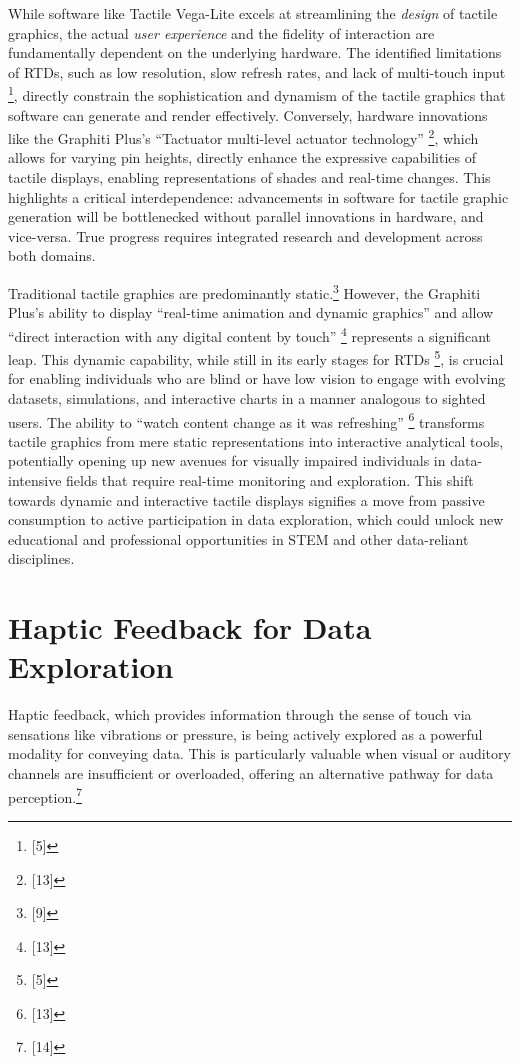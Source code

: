 While software like Tactile Vega-Lite excels at streamlining the \textit{design} of tactile graphics, the actual \textit{user experience} and the fidelity of interaction are fundamentally dependent on the underlying hardware. The identified limitations of RTDs, such as low resolution, slow refresh rates, and lack of multi-touch input \footnote{[5]}, directly constrain the sophistication and dynamism of the tactile graphics that software can generate and render effectively. Conversely, hardware innovations like the Graphiti Plus's ``Tactuator\texttrademark{} multi-level actuator technology'' \footnote{[13]}, which allows for varying pin heights, directly enhance the expressive capabilities of tactile displays, enabling representations of shades and real-time changes. This highlights a critical interdependence: advancements in software for tactile graphic generation will be bottlenecked without parallel innovations in hardware, and vice-versa. True progress requires integrated research and development across both domains.

Traditional tactile graphics are predominantly static.\footnote{[9]} However, the Graphiti Plus's ability to display ``real-time animation and dynamic graphics'' and allow ``direct interaction with any digital content by touch'' \footnote{[13]} represents a significant leap. This dynamic capability, while still in its early stages for RTDs \footnote{[5]}, is crucial for enabling individuals who are blind or have low vision to engage with evolving datasets, simulations, and interactive charts in a manner analogous to sighted users. The ability to ``watch content change as it was refreshing'' \footnote{[13]} transforms tactile graphics from mere static representations into interactive analytical tools, potentially opening up new avenues for visually impaired individuals in data-intensive fields that require real-time monitoring and exploration. This shift towards dynamic and interactive tactile displays signifies a move from passive consumption to active participation in data exploration, which could unlock new educational and professional opportunities in STEM and other data-reliant disciplines.

\section{Haptic Feedback for Data Exploration}
Haptic feedback, which provides information through the sense of touch via sensations like vibrations or pressure, is being actively explored as a powerful modality for conveying data. This is particularly valuable when visual or auditory channels are insufficient or overloaded, offering an alternative pathway for data perception.\footnote{[14]}

